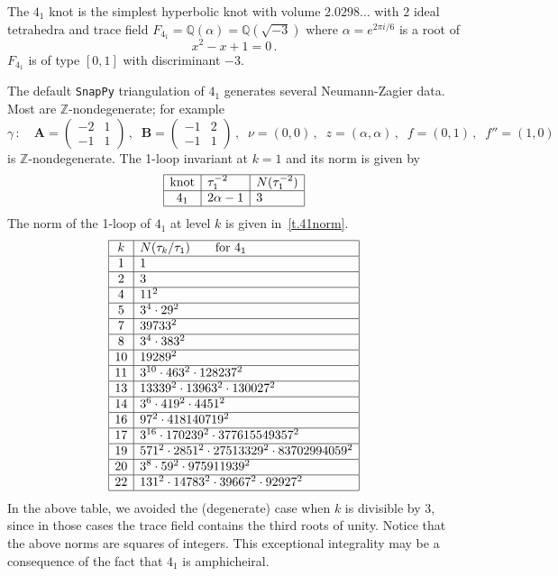 \documentclass[12pt]{amsart}
\theoremstyle{definition}
\def\BZ{\mathbb Z}
\def\BQ{\mathbb Q}
\def\a{\alpha}
\def\ga{\gamma}
\def\be{  \begin{equation} }
\def\ee{  \end{equation} }
\newcommand{\Z}{\mathbb{Z}}
\newcommand{\mb}{\mathbf}
\begin{document}
The $4_1$ knot is the simplest hyperbolic knot with
volume $2.0298\dots$ with $2$ ideal tetrahedra and trace
field $F_{4_1}=\BQ(\a)=\BQ(\sqrt{-3})$ where $\a=e^{2 \pi i/6}$ is a root of 
$$
x^2 - x + 1 = 0\,.
$$
$F_{4_1}$ is of type $[0,1]$ with discriminant $-3$.

The default {\tt SnapPy} triangulation of $4_1$ generates several 
Neumann-Zagier data. Most are $\Z$-nondegenerate; for example 
\be
\ga\,:\quad  %
 \mb A = \begin{pmatrix}-2&1\\-1&1\end{pmatrix}\,,\;\;
\mb B= \begin{pmatrix} -1&2\\-1&1 \end{pmatrix}\,,\;\; 
\nu = (0,0)\,,\;\; z = (\a,\a)\,,\;\; f=(0,1)\,,\;\;f''=(1,0)\,
\ee
is $\BZ$-nondegenerate. The 1-loop invariant at $k=1$ and its
norm is given by
\be
\label{eq.1loop41}
\begin{array}{|c|l|l|} \hline
\text{knot} & \tau_1^{-2} & N(\tau_1^{-2}) \\ \hline
4_1 & 2 \a - 1 & 3 \\ \hline
\end{array} 
\ee
The norm of the 1-loop of $4_1$ at level $k$ is given in~\eqref{t.41norm}.
{\small
\be
\label{t.41norm}
\begin{array}{|c|l|} \hline
k & N(\tau_k/\tau_1) \qquad \text{for $4_1$} \\ \hline
1 & 1  \\ \hline 
2 & 3  \\ \hline
4 & 11^2  \\ \hline
5 & 3^4 \cdot 29^2  \\ \hline
7 & 39733^2  \\ \hline 
8 &  3^4 \cdot 383^2 \\ \hline
10 & 19289^2 \\ \hline 
11 & 3^{10} \cdot 463^2 \cdot 128237^2 \\ \hline 
13 & 13339^2 \cdot 13963^2 \cdot 130027^2 \\ \hline 
14 & 3^6 \cdot 419^2 \cdot 4451^2 \\ \hline 
16 & 97^2 \cdot 418140719^2 \\ \hline 
17 & 3^{16} \cdot 170239^2 \cdot 377615549357^2 \\ \hline 
19 & 571^2 \cdot 2851^2 \cdot 27513329^2 \cdot 83702994059^2 \\ \hline 
20 & 3^8 \cdot 59^2 \cdot 975911939^2 \\ \hline 
22 & 131^2 \cdot 14783^2 \cdot 39667^2 \cdot 92927^2 \\ \hline 
\end{array}
\ee
}
In the above table, we avoided the (degenerate) case when $k$ is divisible 
by $3$, since in those cases the trace field contains the third roots of unity.
Notice that the above norms are squares of integers. This exceptional
integrality may be a consequence of the fact that $4_1$ is amphicheiral.
\end{document}
